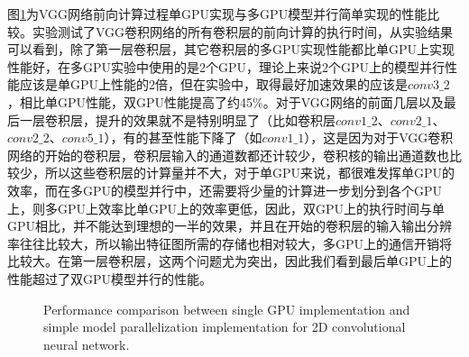 图\ref{singleAndSimple}为VGG网络前向计算过程单GPU实现与多GPU模型并行简单实现的性能比较。实验测试了VGG卷积网络的所有卷积层的前向计算的执行时间，从实验结果可以看到，除了第一层卷积层，其它卷积层的多GPU实现性能都比单GPU上实现性能好，在多GPU实验中使用的是2个GPU，理论上来说2个GPU上的模型并行性能应该是单GPU上性能的2倍，但在实验中，取得最好加速效果的应该是$conv3 \_2$，相比单GPU性能，双GPU性能提高了约45\%。对于VGG网络的前面几层以及最后一层卷积层，提升的效果就不是特别明显了（比如卷积层$conv1\_2$、$conv2\_1$、$conv2\_2$、$conv5\_1$），有的甚至性能下降了（如$conv1\_1$），这是因为对于VGG卷积网络的开始的卷积层，卷积层输入的通道数都还计较少，卷积核的输出通道数也比较少，所以这些卷积层的计算量并不大，对于单GPU来说，都很难发挥单GPU的效率，而在多GPU的模型并行中，还需要将少量的计算进一步划分到各个GPU上，则多GPU上效率比单GPU上的效率更低，因此，双GPU上的执行时间与单GPU相比，并不能达到理想的一半的效果，并且在开始的卷积层的输入输出分辨率往往比较大，所以输出特征图所需的存储也相对较大，多GPU上的通信开销将比较大。在第一层卷积层，这两个问题尤为突出，因此我们看到最后单GPU上的性能超过了双GPU模型并行的性能。

\begin{figure}[tbh]%
\centering
{}
\caption{Performance comparison between single GPU implementation and simple model parallelization implementation for 2D convolutional neural network.}
\label{singleAndSimple}
\end{figure}

